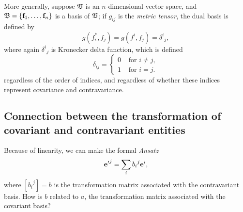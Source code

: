 More generally,
suppose ${\frak V}$ is an $n$-dimensional vector space, and
${\frak B} = \{{\bf f}_1,\ldots , {\bf f}_n\}$
is a basis of  ${\frak V}$;
if $g_{ij}$ is the {\em metric tensor},
the dual basis is defined by
\begin{equation}
g(f_i^*, f_j)=g( f^i,f_j)={\delta^i}_{j},
\end{equation}
where again  ${\delta^i}_{j}$    is Kronecker delta function, which is defined
\begin{equation}
\delta_{ij} =\begin{cases}
0  &\text{ for }i\neq j , \\
1  &\text{ for }i = j.
\end{cases}
\end{equation}
regardless of the order of indices, and regardless of whether these indices represent covariance and contravariance.

\subsection{Connection between the transformation of covariant and contravariant entities}

Because of linearity, we can make the formal {\it Ansatz}
\begin{equation}
{{\bf e}'}^j=\sum_i{b_i}^j{\bf e}^i,
\end{equation}
where $\left[{b_i}^j\right] = b$ is
the transformation matrix associated with the contravariant basis.
How is $b$ related to $a$,
the transformation matrix associated with the covariant basis?

